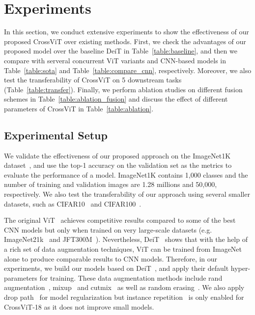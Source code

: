 \documentclass[10pt,twocolumn,letterpaper]{article}
\def\ours{CrossViT\xspace}
\newcommand{\myparagraph}[1]{\vspace{1mm} \noindent {\textbf{#1}}}
\newcommand{\myparagraphfirst}[1]{\vspace{0mm} \noindent {\textbf{#1}}}
\begin{document}
 
 
\section{Experiments}
\label{sec:exp}

In this section, we conduct extensive experiments to show the effectiveness of our proposed \ours over existing methods. First, we check the advantages of our proposed model over the baseline DeiT in Table~\ref{table:baseline}, and then we compare with serveral concurrent ViT variants and CNN-based models in Table~\ref{table:sota} and Table~\ref{table:compare_cnn}, respectively. Moreover, we also test the transferability of \ours on 5 downstream tasks (Table~\ref{table:transfer}). Finally, we perform ablation studies on different fusion schemes in Table~\ref{table:ablation_fusion} and discuss the effect of different parameters of \ours in Table~\ref{table:ablation}.

\subsection{Experimental Setup}
\myparagraphfirst{Dataset.}
We validate the effectiveness of our proposed approach on the ImageNet1K dataset~\cite{imagenet_deng2009}, and use the top-1 accuracy on the validation set as the metrics to evaluate the performance of a model. ImageNet1K contains 1,000 classes and the number of training and validation images are 1.28 millions and 50,000, respectively. 
We also test the transferability of our approach using several smaller datasets, such as CIFAR10~\cite{cifar_krizhevsky2009learning} and CIFAR100~\cite{cifar_krizhevsky2009learning}. 


\myparagraph{Training and Evaluation.}
The original ViT~\cite{ViT_dosovitskiy2021an} achieves competitive results compared to some of the best CNN models but only when trained on very large-scale datasets (e.g. ImageNet21k~\cite{imagenet_deng2009} and JFT300M~\cite{JFT300M_ICCV_2017}). Nevertheless, DeiT~\cite{DeiT_touvron2020} shows that  with the help of a rich set of data augmentation techniques, ViT can be trained from ImageNet alone to produce comparable results to CNN models. Therefore, in our experiments, we build our models based on DeiT~\cite{DeiT_touvron2020}, and apply their default hyper-parameters for training. These data augmentation methods include rand augmentation~\cite{RandAug_NEURIPS2020_Cubuk}, mixup~\cite{Mixup_zhang2018} and cutmix~\cite{CutMix_Yun_2019_ICCV} as well as random erasing~\cite{RandAug_NEURIPS2020_Cubuk}. We also apply drop path~\cite{efficientnet_pmlr_tan_19} for model regularization but instance repetition~\cite{InstanceRepetition_Hoffer_2020_CVPR} is only enabled for \ours-18 as it does not improve small models. 
\end{document}
